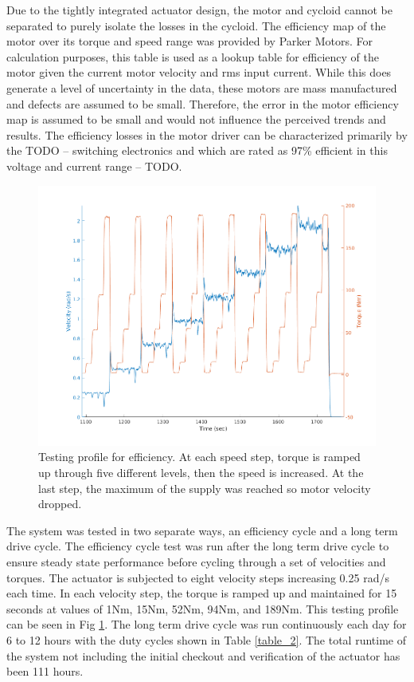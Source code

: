 Due to the tightly integrated actuator design, the motor and cycloid cannot be separated to purely isolate the losses in the cycloid.
The efficiency map of the motor over its torque and speed range was provided by Parker Motors.
For calculation purposes, this table is used as a lookup table for efficiency of the motor given the current motor velocity and rms input current.
While this does generate a level of uncertainty in the data, these motors are mass manufactured and defects are assumed to be small.
Therefore, the error in the motor efficiency map is assumed to be small and would not influence the perceived trends and results.
The efficiency losses in the motor driver can be characterized primarily by the TODO -- switching electronics and which are rated as 97\% efficient in this voltage and current range -- TODO.

\begin{figure}[!b]
   \centering
   \includegraphics[width=\linewidth]{eff_test_profile_v3}
   \caption{Testing profile for efficiency.
   At each speed step, torque is ramped up through five different levels, then the speed is increased.
   At the last step, the maximum of the supply was reached so motor velocity dropped.}
   \label{eff_profile}
\end{figure}

The system was tested in two separate ways, an efficiency cycle and a long term drive cycle.
The efficiency cycle test was run after the long term drive cycle to ensure steady state performance before cycling through a set of velocities and torques.
The actuator is subjected to eight velocity steps increasing 0.25 rad/s each time.
In each velocity step, the torque is ramped up and maintained for 15 seconds at values of 1Nm, 15Nm, 52Nm, 94Nm, and 189Nm.
This testing profile can be seen in Fig \ref{eff_profile}.
The long term drive cycle was run continuously each day for 6 to 12 hours with the duty cycles shown in Table \ref{table_2}.
The total runtime of the system not including the initial checkout and verification of the actuator has been 111 hours.

